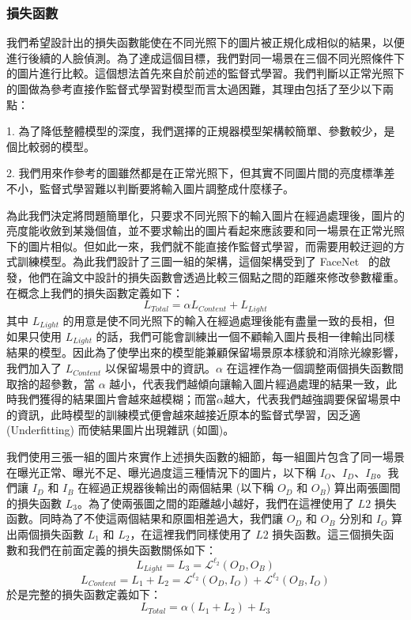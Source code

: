 \subsubsection{損失函數}

我們希望設計出的損失函數能使在不同光照下的圖片被正規化成相似的結果，以便進行後續的人臉偵測。為了達成這個目標，我們對同一場景在三個不同光照條件下的圖片進行比較。這個想法首先來自於前述的監督式學習。我們判斷以正常光照下的圖做為參考直接作監督式學習對模型而言太過困難，其理由包括了至少以下兩點：

1. 為了降低整體模型的深度，我們選擇的正規器模型架構較簡單、參數較少，是個比較弱的模型。

2. 我們用來作參考的圖雖然都是在正常光照下，但其實不同圖片間的亮度標準差不小，監督式學習難以判斷要將輸入圖片調整成什麼樣子。

為此我們決定將問題簡單化，只要求不同光照下的輸入圖片在經過處理後，圖片的亮度能收斂到某幾個值，並不要求輸出的圖片看起來應該要和同一場景在正常光照下的圖片相似。但如此一來，我們就不能直接作監督式學習，而需要用較迂迴的方式訓練模型。為此我們設計了三圖一組的架構，這個架構受到了 FaceNet~\cite{schroff2015facenet} 的啟發，他們在論文中設計的損失函數會透過比較三個點之間的距離來修改參數權重。在概念上我們的損失函數定義如下：
$$L_{Total} = \alpha L_{Content} + L_{Light}$$
其中 $L_{Light}$ 的用意是使不同光照下的輸入在經過處理後能有盡量一致的長相，但如果只使用 $L_{Light}$ 的話，我們可能會訓練出一個不顧輸入圖片長相一律輸出同樣結果的模型。因此為了使學出來的模型能兼顧保留場景原本樣貌和消除光線影響，我們加入了 $L_{Content}$ 以保留場景中的資訊。$\alpha$ 在這裡作為一個調整兩個損失函數間取捨的超參數，當 $\alpha$ 越小，代表我們越傾向讓輸入圖片經過處理的結果一致，此時我們獲得的結果圖片會越來越模糊；而當$\alpha$越大，代表我們越強調要保留場景中的資訊，此時模型的訓練模式便會越來越接近原本的監督式學習，因乏適 (Underfitting) 而使結果圖片出現雜訊 (如圖)。

我們使用三張一組的圖片來實作上述損失函數的細節，每一組圖片包含了同一場景在曝光正常、曝光不足、曝光過度這三種情況下的圖片，以下稱 $I_O$、$I_D$、$I_B$。我們讓 $I_D$ 和 $I_B$ 在經過正規器後輸出的兩個結果 (以下稱 $O_D$ 和 $O_B$) 算出兩張圖間的損失函數 $L_3$。為了使兩張圖之間的距離越小越好，我們在這裡使用了 $L2$ 損失函數。同時為了不使這兩個結果和原圖相差過大，我們讓 $O_D$ 和 $O_B$ 分別和 $I_O$ 算出兩個損失函數 $L_1$ 和 $L_2$，在這裡我們同樣使用了 $L2$ 損失函數。這三個損失函數和我們在前面定義的損失函數關係如下：
$$L_{Light} = L_3 = \mathcal{L}^{\ell_2}(O_D, O_B)$$
$$L_{Content} = L_1 + L_2 = \mathcal{L}^{\ell_2}(O_D, I_O) + \mathcal{L}^{\ell_2}(O_B, I_O)$$
於是完整的損失函數定義如下：
$$L_{Total} = \alpha (L_1 + L_2) + L_3$$

